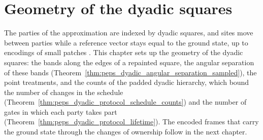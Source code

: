 \chapter{Geometry of the dyadic squares}
\label{ch:peps_frames_dyadic_geometry}

The parties of the approximation are indexed by dyadic squares, and sites move
between parties while a reference vector stays equal to the ground state, up to
encodings of small patches \cite[Sections~6 and~7]{OpenAI2026PolynomialPEPS}.
This chapter sets up the geometry of the dyadic squares: the bands along the
edges of a repainted square, the angular separation of these bands
(Theorem~\ref{thm:peps_dyadic_angular_separation_sampled}), the point
treatments, and the counts of the padded dyadic hierarchy, which bound the
number of changes in the schedule
(Theorem~\ref{thm:peps_dyadic_protocol_schedule_counts}) and the number of
gates in which each party takes part
(Theorem~\ref{thm:peps_dyadic_protocol_lifetime}). The encoded frames
that carry the ground state through the changes of ownership follow in the next
chapter.


